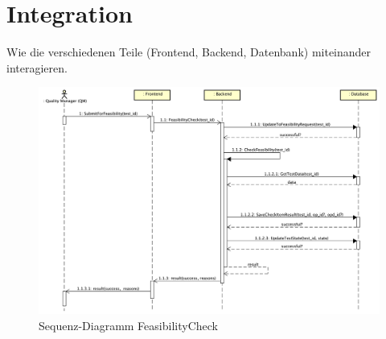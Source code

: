 \section{Integration}
Wie die verschiedenen Teile (Frontend, Backend, Datenbank) miteinander interagieren.

\begin{figure}[!h]
    \centering
    \includegraphics[width=1\textwidth]{bilder/Sequence-Integration.png}
    \caption{Sequenz-Diagramm FeasibilityCheck}
    \label{fig:sequence-diagram}
\end{figure}